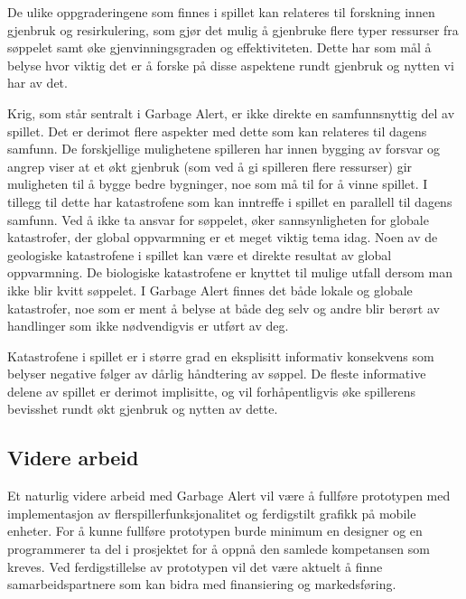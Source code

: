 De ulike oppgraderingene som finnes i spillet kan relateres til forskning innen gjenbruk og resirkulering, som gjør det mulig å gjenbruke flere typer ressurser fra søppelet samt øke gjenvinningsgraden og effektiviteten. Dette har som mål å belyse hvor viktig det er å forske på disse aspektene rundt gjenbruk og nytten vi har av det.

Krig, som står sentralt i Garbage Alert, er ikke direkte en samfunnsnyttig del av spillet. Det er derimot flere aspekter med dette som kan relateres til dagens samfunn. De forskjellige mulighetene spilleren har innen bygging av forsvar og angrep viser at et økt gjenbruk (som ved å gi spilleren flere ressurser) gir muligheten til å bygge bedre bygninger, noe som må til for å vinne spillet. I tillegg til dette har katastrofene som kan inntreffe i spillet en parallell til dagens samfunn. Ved å ikke ta ansvar for søppelet, øker sannsynligheten for globale katastrofer, der global oppvarmning er et meget viktig tema idag. Noen av de geologiske katastrofene i spillet kan være et direkte resultat av global oppvarmning. De biologiske katastrofene er knyttet til mulige utfall dersom man ikke blir kvitt søppelet. I Garbage Alert finnes det både lokale og globale katastrofer, noe som er ment å belyse at både deg selv og andre blir berørt av handlinger som ikke nødvendigvis er utført av deg.

Katastrofene i spillet er i større grad en eksplisitt informativ konsekvens som belyser negative følger av dårlig håndtering av søppel. De fleste informative delene av spillet er derimot implisitte, og vil forhåpentligvis øke spillerens bevisshet rundt økt gjenbruk og nytten av dette. 

\subsection{Videre arbeid}
Et naturlig videre arbeid med Garbage Alert vil være å fullføre prototypen med implementasjon av flerspillerfunksjonalitet og ferdigstilt grafikk på mobile enheter. For å kunne fullføre prototypen burde minimum en designer og en programmerer ta del i prosjektet for å oppnå den samlede kompetansen som kreves. Ved ferdigstillelse av prototypen vil det være aktuelt å finne samarbeidspartnere som kan bidra med finansiering og markedsføring.
